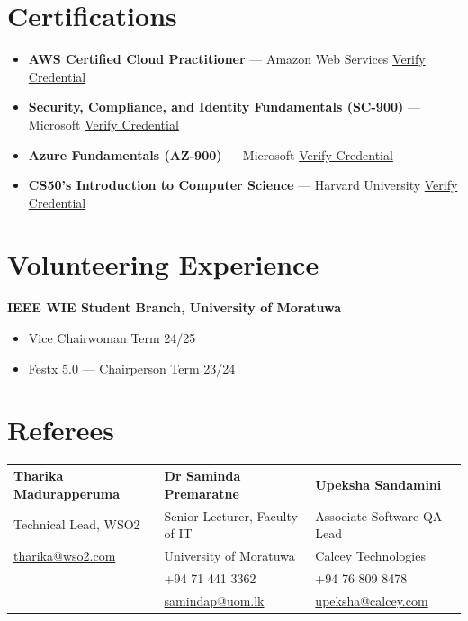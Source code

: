 \documentclass[a4paper,10pt]{article}
\begin{document}
\section{Certifications}
\vspace{2pt}

\begin{itemize}
  \item \textbf{AWS Certified Cloud Practitioner} --- Amazon Web Services \hfill \href{https://aws.amazon.com}{Verify Credential}
  \item \textbf{Security, Compliance, and Identity Fundamentals (SC-900)} --- Microsoft \hfill \href{https://microsoft.com}{Verify Credential}
  \item \textbf{Azure Fundamentals (AZ-900)} --- Microsoft \hfill \href{https://microsoft.com}{Verify Credential}
  \item \textbf{CS50's Introduction to Computer Science} --- Harvard University \hfill \href{https://cs50.harvard.edu}{Verify Credential}
\end{itemize}

\section{Volunteering Experience}
\vspace{2pt}

\textbf{IEEE WIE Student Branch, University of Moratuwa}\\[-2pt]
\begin{itemize}
  \item Vice Chairwoman \hfill Term 24/25
  \item Festx 5.0 --- Chairperson \hfill Term 23/24
\end{itemize}

\section{Referees}
\vspace{2pt}

\begin{tabularx}{\textwidth}{XXX}
\textbf{Tharika Madurapperuma} & \textbf{Dr Saminda Premaratne} & \textbf{Upeksha Sandamini} \\
Technical Lead, WSO2 & Senior Lecturer, Faculty of IT & Associate Software QA Lead \\
\href{mailto:tharika@wso2.com}{tharika@wso2.com} & University of Moratuwa & Calcey Technologies \\
 & +94 71 441 3362 & +94 76 809 8478 \\
 & \href{mailto:samindap@uom.lk}{samindap@uom.lk} & \href{mailto:upeksha@calcey.com}{upeksha@calcey.com} \\
\end{tabularx}
\end{document}
